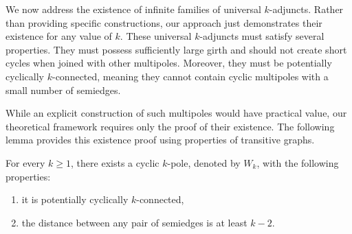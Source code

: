 \documentclass[12pt, twoside]{book}
\begin{document}
We now address the existence of infinite families of universal $k$-adjuncts. Rather than providing specific constructions, our approach just demonstrates their existence for any value of $k$. These universal $k$-adjuncts must satisfy several properties. They must possess sufficiently large girth and should not create short cycles when joined with other multipoles. Moreover, they must be potentially cyclically $k$-connected, meaning they cannot contain cyclic multipoles with a small number of semiedges.

While an explicit construction of such multipoles would have practical value, our theoretical framework requires only the proof of their existence. The following lemma provides this existence proof using properties of transitive graphs.

\begin{lemma}\label{lem:cyclic-k-pole-no-short-cycles-exists}
	For every $k\geq 1$, there exists a cyclic $k$-pole, denoted by $W_k$, with the following properties:
	\begin{enumerate}[label=(\roman*)]
		\item it is potentially cyclically $k$-connected,
		\item the distance between any pair of semiedges is at least $k-2$.
	\end{enumerate}
\end{lemma}
\end{document}
